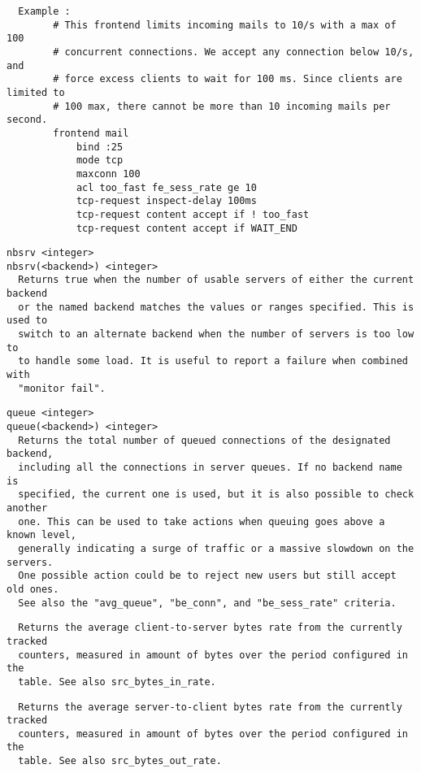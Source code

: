 \begin{verbatim}
  Example :
        # This frontend limits incoming mails to 10/s with a max of 100
        # concurrent connections. We accept any connection below 10/s, and
        # force excess clients to wait for 100 ms. Since clients are limited to
        # 100 max, there cannot be more than 10 incoming mails per second.
        frontend mail
            bind :25
            mode tcp
            maxconn 100
            acl too_fast fe_sess_rate ge 10
            tcp-request inspect-delay 100ms
            tcp-request content accept if ! too_fast
            tcp-request content accept if WAIT_END
\end{verbatim}

\begin{verbatim}
nbsrv <integer>
nbsrv(<backend>) <integer>
  Returns true when the number of usable servers of either the current backend
  or the named backend matches the values or ranges specified. This is used to
  switch to an alternate backend when the number of servers is too low to
  to handle some load. It is useful to report a failure when combined with
  "monitor fail".
\end{verbatim}

\begin{verbatim}
queue <integer>
queue(<backend>) <integer>
  Returns the total number of queued connections of the designated backend,
  including all the connections in server queues. If no backend name is
  specified, the current one is used, but it is also possible to check another
  one. This can be used to take actions when queuing goes above a known level,
  generally indicating a surge of traffic or a massive slowdown on the servers.
  One possible action could be to reject new users but still accept old ones.
  See also the "avg_queue", "be_conn", and "be_sess_rate" criteria.
\end{verbatim}

\begin{verbatim}
  Returns the average client-to-server bytes rate from the currently tracked
  counters, measured in amount of bytes over the period configured in the
  table. See also src_bytes_in_rate.
\end{verbatim}

\begin{verbatim}
  Returns the average server-to-client bytes rate from the currently tracked
  counters, measured in amount of bytes over the period configured in the
  table. See also src_bytes_out_rate.
\end{verbatim}

